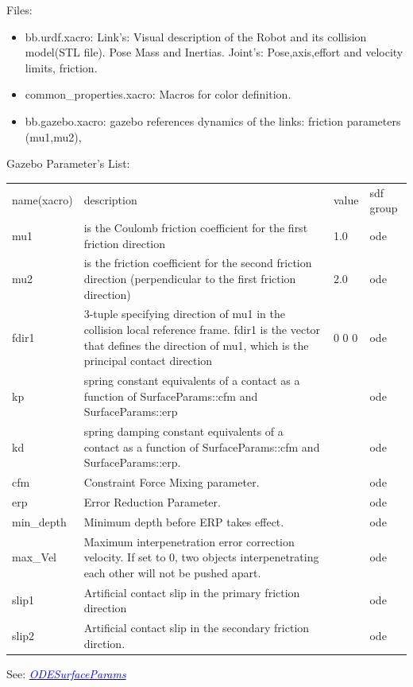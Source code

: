 \documentclass[twoside,colorback,accentcolor=tud4c,11pt]{tudreport}
\newcommand{\mylink}[2] {	\href{#1}{	\textit{\textcolor{blue}{#2}}}}
\begin{document}
Files:
\begin{itemize}
	\item bb.urdf.xacro: Link's: Visual description of the Robot and its collision model(STL file). Pose Mass and Inertias. Joint's: Pose,axis,effort and velocity limits, friction.
	\item common\_properties.xacro: Macros for color definition.
	\item bb.gazebo.xacro: gazebo references dynamics of the links: friction parameters (mu1,mu2), 
\end{itemize}

Gazebo Parameter's List:\\
\begin{tabular}{l L{12cm} l l}
	name(xacro)&description&value&sdf group\\
	mu1&is the Coulomb friction coefficient for the first friction direction&1.0&ode\\
	mu2& is the friction coefficient for the second friction direction (perpendicular to the first friction direction)&2.0&ode\\
	fdir1& 3-tuple specifying direction of mu1 in the collision local reference frame. fdir1 is the vector that defines the direction of mu1, which is the principal contact direction &0 0 0&ode\\
	kp&spring constant equivalents of a contact as a function of SurfaceParams::cfm and SurfaceParams::erp & &ode \\
	kd&spring damping constant equivalents of a contact as a function of SurfaceParams::cfm and SurfaceParams::erp.   & &ode \\
	cfm&Constraint Force Mixing parameter.& &ode \\
	erp&Error Reduction Parameter.& &ode \\
	min\_depth&Minimum depth before ERP takes effect.   & &ode \\
	max\_Vel& Maximum interpenetration error correction velocity.
	If set to 0, two objects interpenetrating each other will not be pushed apart.  & &ode \\
	slip1&Artificial contact slip in the primary friction direction  & &ode \\
	slip2&Artificial contact slip in the secondary friction dirction.& &ode \\
	\end{tabular}

See: \mylink{http://osrf-distributions.s3.amazonaws.com/gazebo/api/dev/classgazebo_1_1physics_1_1ODESurfaceParams.html}{ODESurfaceParams}
\end{document}

